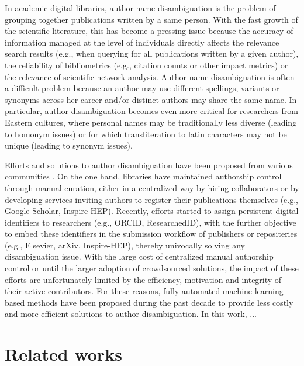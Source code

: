 \documentclass{article}
\begin{document}
In academic digital libraries, author name disambiguation is the problem of
grouping together publications written by a same person.  With the fast growth
of the scientific literature, this has become a pressing issue because the
accuracy of information managed at the level of individuals directly affects
the relevance search results (e.g., when querying for all publications written
by a given author), the reliability of bibliometrics (e.g., citation counts or
other impact metrics) or the relevance of scientific network analysis. Author
name disambiguation is often a difficult problem because an author may use
different spellings, variants or synonyms across her career and/or distinct
authors may share the same name. In particular, author disambiguation becomes
even more critical for researchers from Eastern cultures, where personal names
may be traditionally less diverse (leading to homonym issues) or for which
transliteration to latin characters may not be unique (leading to synonym
issues).

Efforts and solutions to author disambiguation have been proposed from various
communities \citep{liu2014author}. On the one hand, libraries have maintained
authorship control through manual curation, either in a centralized way by
hiring collaborators or by developing services inviting authors to register
their publications themselves (e.g., Google Scholar, Inspire-HEP). Recently,
efforts started to assign persistent digital identifiers to researchers (e.g.,
ORCID, ResearchedID), with the further objective to embed these identifiers in
the submission workflow of publishers or repositeries (e.g., Elsevier, arXiv,
Inspire-HEP), thereby univocally solving any disambiguation issue. With the
large cost of centralized manual authorship control or until the larger
adoption of crowdsourced solutions, the impact of these efforts are
unfortunately limited by the efficiency, motivation and integrity of their
active contributors. For these reasons, fully automated machine learning-based
methods have been proposed during the past decade to provide less costly and
more efficient solutions to author disambiguation. In this work, ...













\section{Related works}
\label{relate-works}
\end{document}
